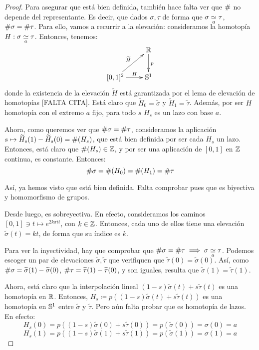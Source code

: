 \begin{theo}
\begin{proof}
Para asegurar que está bien definida, también hace falta ver que $\indice$ no depende del representante. Es decir, que dados $\sigma,\tau$ de forma que $\sigma\homot[a]\tau$, $\indice\sigma = \indice\tau$. Para ello, vamos a recurrir a la elevación: consideramos la homotopía $H:\sigma\homot[a]\tau$. Entonces, tenemos:
\[\xymatrix{
& \R \ar[d]^p \\
[0,1]^2 \ar[ru]^{\widetilde{H}} \ar[r]^-H & \Sfe^1
}\]
donde la existencia de la elevación $\widetilde{H}$ está garantizada por el lema de elevación de homotopías [FALTA CITA]. Está claro que $\widetilde{H}_0 = \widetilde{\sigma}$ y $\widetilde{H}_1 = \widetilde{\tau}$. Además, por ser $H$ homotopía con el extremo $a$ fijo, para todo $s$ $H_s$ es un lazo con base $a$.

Ahora, como queremos ver que $\indice\sigma = \indice\tau$, consideramos la aplicación $s\mapsto \widetilde{H}_s(1)-\widetilde{H}_s(0)=\indice(H_s)$, que está bien definida por ser cada $H_s$ un lazo. Entonces, está claro que $\indice(H_s)\in\Z$, y por ser una aplicación de $[0,1]$ en $\Z$ continua, es constante. Entonces:
\[\indice\sigma = \indice(H_0) = \indice(H_1) = \indice\tau\]

Así, ya hemos visto que está bien definida. Falta comprobar pues que es biyectiva y homomorfismo de grupos.

Desde luego, es sobreyectiva. En efecto, consideramos los caminos $[0,1]\ni t\mapsto e^{2k\pi it}$, con $k\in\Z$.  Entonces, cada uno de ellos tiene una elevación $\widetilde{\sigma}(t)=kt$, de forma que su índice es $k$.

Para ver la inyectividad, hay que comprobar que $\indice\sigma = \indice\tau\implies \sigma\homot[a]\tau$. Podemos escoger un par de elevaciones $\widetilde{\sigma},\widetilde{\tau}$ que verifiquen que $\widetilde{\tau}(0)=\widetilde{\sigma}(0)$. Así, como $\indice\sigma = \widetilde{\sigma}(1)-\widetilde{\sigma}(0)$, $\indice\tau = \widetilde{\tau}(1)-\widetilde{\tau}(0)$, y son iguales, resulta que $\widetilde{\sigma}(1)=\widetilde{\tau}(1)$.

Ahora, está claro que la interpolación lineal $(1-s)\widetilde{\sigma}(t) + s\widetilde{\tau}(t)$ es una homotopía en $\R$. Entonces, $H_s \coloneqq p((1-s)\widetilde{\sigma}(t) + s\widetilde{\tau}(t))$ es una homotopía en $\Sfe^1$ entre $\widetilde{\sigma}$ y $\widetilde{\tau}$. Pero aún falta probar que es homotopía de lazos. En efecto:
\[H_s(0)= p((1-s)\widetilde{\sigma}(0) + s\widetilde{\tau}(0))=p(\widetilde{\sigma}(0))=\sigma(0)=a\]
\[H_s(1)= p((1-s)\widetilde{\sigma}(1) + s\widetilde{\tau}(1))=p(\widetilde{\sigma}(1))=\sigma(1)=a\]


\end{proof}
\end{theo}
